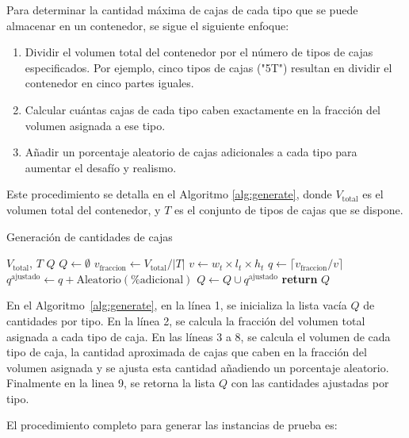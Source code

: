 \documentclass[openany]{article}
\begin{document}
Para determinar la cantidad máxima de cajas de cada tipo que se puede almacenar en un contenedor, se sigue el siguiente enfoque:

\begin{enumerate}
    \item Dividir el volumen total del contenedor por el número de tipos de cajas especificados. Por ejemplo, cinco tipos de cajas ("5T") resultan en dividir el contenedor en cinco partes iguales.
    \item Calcular cuántas cajas de cada tipo caben exactamente en la fracción del volumen asignada a ese tipo.
    \item Añadir un porcentaje aleatorio de cajas adicionales a cada tipo para aumentar el desafío y realismo.
\end{enumerate}

Este procedimiento se detalla en el Algoritmo \ref{alg:generate}, donde $V_{\text{total}}$ es el volumen total del contenedor, y $T$ es el conjunto de tipos de cajas que se dispone.

\begin{algorithm}[H]
    \caption{Generación de cantidades de cajas}
    \label{alg:generate}
    \begin{algorithmic}[1]
        \Require $V_{\text{total}}$, $T$
        \Ensure $Q$
        \State $Q \gets \emptyset$
        \State $v_{\text{fraccion}} \gets V_{\text{total}} / |T|$ 
        \State $v \gets w_t \times l_t \times h_t$ 
        \State $q \gets \lceil v_{\text{fraccion}} / v \rceil$
        \State $q^{\text{ajustado}} \gets q + \text{Aleatorio}(\% \text{adicional})$ 
        \State $Q \gets Q \cup q^{\text{ajustado}}$
        \EndFor
        \State \textbf{return} $Q$
    \end{algorithmic}
\end{algorithm}

En el Algoritmo~\ref{alg:generate}, en la línea 1, se inicializa la lista vacía $Q$ de cantidades por tipo. En la línea 2, se calcula la fracción del volumen total asignada a cada tipo de caja. En las líneas 3 a 8, se calcula el volumen de cada tipo de caja, la cantidad aproximada de cajas que caben en la fracción del volumen asignada y se ajusta esta cantidad añadiendo un porcentaje aleatorio. Finalmente en la linea 9, se retorna la lista $Q$ con las cantidades ajustadas por tipo.

El procedimiento completo para generar las instancias de prueba es:
\end{document}
